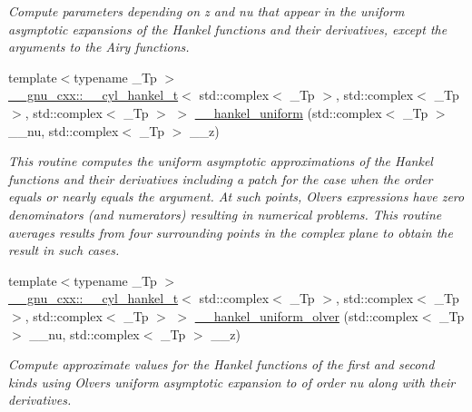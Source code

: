 \begin{DoxyCompactItemize}
\begin{DoxyCompactList}\small\item\em Compute parameters depending on z and nu that appear in the uniform asymptotic expansions of the Hankel functions and their derivatives, except the arguments to the Airy functions. \end{DoxyCompactList}\item 
{\footnotesize template$<$typename \+\_\+\+Tp $>$ }\\\hyperlink{struct____gnu__cxx_1_1____cyl__hankel__t}{\+\_\+\+\_\+gnu\+\_\+cxx\+::\+\_\+\+\_\+cyl\+\_\+hankel\+\_\+t}$<$ std\+::complex$<$ \+\_\+\+Tp $>$, std\+::complex$<$ \+\_\+\+Tp $>$, std\+::complex$<$ \+\_\+\+Tp $>$ $>$ \hyperlink{namespacestd_1_1____detail_a4de129af45576a92a42fa2b7fc2d17f3}{\+\_\+\+\_\+hankel\+\_\+uniform} (std\+::complex$<$ \+\_\+\+Tp $>$ \+\_\+\+\_\+nu, std\+::complex$<$ \+\_\+\+Tp $>$ \+\_\+\+\_\+z)
\begin{DoxyCompactList}\small\item\em This routine computes the uniform asymptotic approximations of the Hankel functions and their derivatives including a patch for the case when the order equals or nearly equals the argument. At such points, Olver\textquotesingle{}s expressions have zero denominators (and numerators) resulting in numerical problems. This routine averages results from four surrounding points in the complex plane to obtain the result in such cases. \end{DoxyCompactList}\item 
{\footnotesize template$<$typename \+\_\+\+Tp $>$ }\\\hyperlink{struct____gnu__cxx_1_1____cyl__hankel__t}{\+\_\+\+\_\+gnu\+\_\+cxx\+::\+\_\+\+\_\+cyl\+\_\+hankel\+\_\+t}$<$ std\+::complex$<$ \+\_\+\+Tp $>$, std\+::complex$<$ \+\_\+\+Tp $>$, std\+::complex$<$ \+\_\+\+Tp $>$ $>$ \hyperlink{namespacestd_1_1____detail_abbd697ee381eb2e489caa077ba7b00d9}{\+\_\+\+\_\+hankel\+\_\+uniform\+\_\+olver} (std\+::complex$<$ \+\_\+\+Tp $>$ \+\_\+\+\_\+nu, std\+::complex$<$ \+\_\+\+Tp $>$ \+\_\+\+\_\+z)
\begin{DoxyCompactList}\small\item\em Compute approximate values for the Hankel functions of the first and second kinds using Olver\textquotesingle{}s uniform asymptotic expansion to of order {\ttfamily nu} along with their derivatives. \end{DoxyCompactList}\item 

\end{DoxyCompactItemize}
